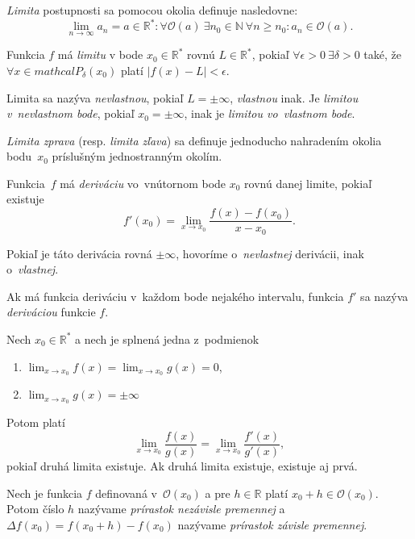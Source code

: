 \begin{definition}[Limita]
	{\em Limita} postupnosti sa pomocou okolia definuje nasledovne:
	\[
		\lim_{n \to \infty} a_n = a \in \mathbb{R}^*: \forall \mathcal{O}(a)~\exists n_0 \in \mathbb{N}~\forall n \geq n_0: a_n \in \mathcal{O}(a).
	\]

	Funkcia $f$ má {\em limitu} v bode $x_0 \in \mathbb{R}^*$ rovnú
	$L \in \mathbb{R}^*$, pokiaľ $\forall \epsilon > 0~\exists \delta > 0$
	také, že $\forall x \in mathcal{P}_{\delta}(x_0)$ platí
	$|f(x) - L| < \epsilon$.
	
	Limita sa nazýva {\em nevlastnou}, pokiaľ $L = \pm \infty$, 
	{\em vlastnou} inak. Je {\em limitou v~nevlastnom bode}, pokiaľ
	$x_0 = \pm \infty$, inak je {\em limitou vo~vlastnom bode}.
	
	{\em Limita zprava} (resp. {\em limita zľava}) sa definuje jednoducho
	nahradením okolia bodu~$x_0$ príslušným jednostranným okolím.
\end {definition}

\begin{definition}[Derivácia]
	Funkcia~$f$ má {\em deriváciu} vo~vnútornom bode $x_0$ rovnú danej 
	limite, pokiaľ existuje
	\[
		f'(x_0) = \lim_{x \to x_0} \frac{f(x)-f(x_0)}{x-x_0}.
	\]
	
	Pokiaľ je táto derivácia rovná $\pm \infty$, hovoríme
	o~{\em nevlastnej} derivácii, inak o~{\em vlastnej}.
	
	Ak má funkcia deriváciu v~každom bode nejakého intervalu,
	funkcia $f'$ sa nazýva {\em deriváciou} funkcie $f$.
\end{definition}

\begin{theorem}
	Nech $x_0 \in \mathbb{R}^*$ a nech je splnená jedna z~podmienok
	\begin{enumerate}
		\item $\lim_{x \to x_0}f(x) = \lim_{x \to x_0}g(x) = 0$,
		\item $\lim_{x \to x_0}g(x)=\pm\infty$
	\end{enumerate}
	Potom platí
	\[
		\lim_{x \to x_0}\frac{f(x)}{g(x)} = \lim_{x \to x_0}\frac{f'(x)}{g'(x)},
	\]
	pokiaľ druhá limita existuje. Ak druhá limita existuje, existuje aj prvá.
\end{theorem}

\begin{definition}[Prírastok]
	Nech je funkcia $f$ definovaná v~$\mathcal{O}(x_0)$ a pre 
	$h \in \mathbb{R}$ platí $x_0 + h \in \mathcal{O}(x_0)$.
	Potom číslo $h$ nazývame {\em prírastok nezávisle premennej}
	a $\Delta f(x_0)=f(x_0+h)-f(x_0)$ nazývame {\em prírastok 
	závisle premennej}.
\end{definition}

